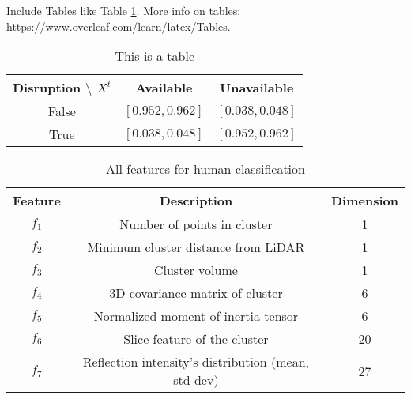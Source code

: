 \documentclass[a4paper, 12pt]{article}
\begin{document}
\begin{sloppypar}
 
  
 



Include Tables like Table \ref{tab:table}. More info on tables: 
\url{https://www.overleaf.com/learn/latex/Tables}.
\begin{table}[h]
    \centering
    \begin{tabular}{c|cc}
    \hline
    Disruption $\setminus$ $X^t$ & Available &  Unavailable \\ \hline \hline
    False      & $[0.952, 0.962]$ & $[0.038, 0.048]$ \\
    True       & $[0.038, 0.048]$ & $[0.952, 0.962]$ \\ \hline
    \end{tabular}
    \caption{This is a table} 
    \label{tab:table}
\end{table}

\begin{table}[h!]
    \centering
    \begin{tabular}{||c|c|c||}
        \hline
        \rowcolor{lightgray}
        \textbf{Feature} & \textbf{Description}                                & \textbf{Dimension} \\ [0.5ex]
        \hline\hline
        $f_1$            & Number of points in cluster                         & 1                  \\
        $f_2$            & Minimum cluster distance from LiDAR                 & 1                  \\
        $f_3$            & Cluster volume                                      & 1                  \\
        $f_4$            & 3D covariance matrix of cluster                     & 6                  \\
        $f_5$            & Normalized moment of inertia tensor                 & 6                  \\
        $f_6$            & Slice feature of the cluster                        & 20                 \\
        $f_7$            & Reflection intensity's distribution (mean, std dev) & 27                 \\ [0.5ex]
        \hline
    \end{tabular}
    \caption{All features for human classification}
    \label{Chap3:Table1}
\end{table}


\end{sloppypar}
\end{document}
